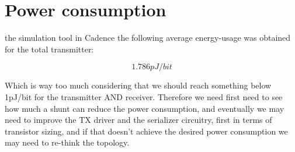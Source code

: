 \section{Power consumption}

 the simulation tool in Cadence the following average energy-usage was obtained for the total transmitter:

$$1.786pJ/bit$$

\noindent Which is way too much considering that we should reach something below 1pJ/bit for the transmitter AND receiver.
Therefore we need first need to see how much a shunt can reduce the power consumption, and eventually we may need to improve the TX driver and the serializer circuitry, first in terms of transistor sizing, and if that doesn't achieve the desired power consumption we may need to re-think the topology.


